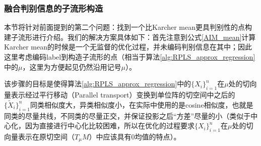 \subsubsection{融合判别信息的子流形构造}
\label{sec:discrim_single_support}
本节将针对前面提到的第二个问题：找到一个比Karcher mean更具判别性的点构建子流形进行介绍。我们的解决方案具体如下：首先注意到公式\ref{AIM_mean}计算Karcher mean的时候是一个无监督的优化过程，并未编码判别信息在其中；因此这里考虑编码label到构造子流形的点（相当于算法\ref{alg:RPLS_approx_regression}中的$\mu$，这里为方便起见仍然沿用记号$\mu$）。

该步骤的目标是使得算法\ref{alg:RPLS_approx_regression}中的$\{X_i\}_{i=1}^{n}$在$\mu$处的切向量表示经过平行移动（Parallel transport\cite{RCCA}）变换到单位阵的切空间中之后的$\{\tilde{X}_i\}_{i=1}^{n}$同类相似度大，异类相似度小，在实际中使用的是cosine相似度，也就是同类的尽量共线，不同类的尽量正交，并保证投影之后“方差”尽量的小（类似于中心化，因为直接进行中心化比较困难，所以在优化的过程要求$\{X_i\}_{i=1}^{n}$在$\mu$处的切向量表示在原切空间（$T_{\mu}M$）中应该具有0均值的特点）。

